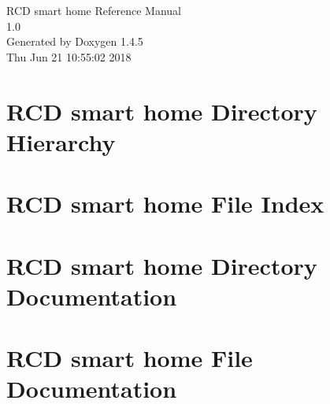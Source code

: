 \documentclass[a4paper]{book}
\begin{document}
\begin{titlepage}
\vspace*{7cm}
\begin{center}
{\Large RCD smart home Reference Manual\\[1ex]\large 1.0 }\\
\vspace*{1cm}
{\large Generated by Doxygen 1.4.5}\\
\vspace*{0.5cm}
{\small Thu Jun 21 10:55:02 2018}\\
\end{center}
\end{titlepage}
\clearemptydoublepage
{}
\tableofcontents
\clearemptydoublepage
{}
\chapter{RCD smart home Directory Hierarchy}

\chapter{RCD smart home File Index}

\chapter{RCD smart home Directory Documentation}






\chapter{RCD smart home File Documentation}

\printindex
\end{document}

